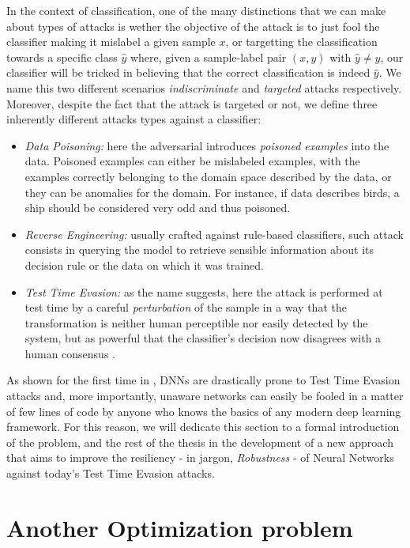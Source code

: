 \documentclass[LaM,binding=0.6cm]{./packages/sapthesis/sapthesis}
\begin{document}
    In the context of classification, one of the many distinctions that we can make about types of attacks is wether the objective of the attack is to just fool the classifier making it mislabel 
    a given sample $ x $, or targetting the classification towards a specific class $ \hat{y} $ where, given a sample-label pair $ (x, y) $ with $ \hat{y} \neq  y $, our classifier will be tricked in
    believing that the correct classification is indeed $ \hat{y} $. We name this two different scenarios \textit{indiscriminate} and \textit{targeted} attacks respectively. Moreover, despite the fact that the attack is targeted 
    or not, we define three inherently different attacks types against a classifier:
    \begin{itemize}
        \item \textit{Data Poisoning:}
        here the adversarial introduces \textit{poisoned examples} into the data. Poisoned examples can either be mislabeled examples, with the examples correctly belonging to the domain space described
        by the data, or they can be anomalies for the domain. For instance, if data describes birds, a ship should be considered very odd and thus poisoned.
        \item \textit{Reverse Engineering:}
        usually crafted against rule-based classifiers, such attack consists in querying the model to retrieve sensible information about its decision rule or the data on which it was trained.
        \item \textit{Test Time Evasion:}
        as the name suggests, here the attack is performed at test time by a careful \textit{perturbation} of the sample in a way that the transformation is neither human perceptible nor
        easily detected by the system, but as powerful that the classifier's decision now disagrees with a human consensus \cite{goodfellow2014explaining}.
    \end{itemize}
    As shown for the first time in \cite{szegedy2013-intriguing}, DNNs are drastically prone to Test Time Evasion attacks and, more importantly, unaware networks can easily be fooled in a matter of
    few lines of code by anyone who knows the basics of any modern deep learning framework. For this reason, we will dedicate this section to a formal introduction of the problem, and the rest of 
    the thesis in the development of a new approach that aims to improve the resiliency - in jargon, \textit{Robustness} - of Neural Networks against today's Test Time Evasion attacks. 

    \section{Another Optimization problem}
        
\end{document}
